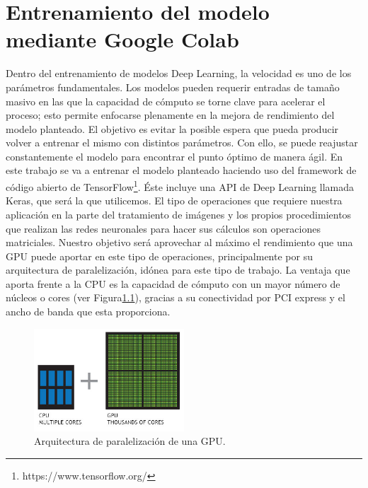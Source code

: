 \mbox{}


\chapter{Entrenamiento del modelo mediante Google Colab}
\label{ch:chapter2}
Dentro del entrenamiento de modelos Deep Learning, la velocidad es uno de los parámetros fundamentales.
Los modelos pueden requerir entradas de tamaño masivo en las que la capacidad de cómputo se torne clave para acelerar el proceso;
esto permite enfocarse plenamente en la mejora de rendimiento del modelo planteado.
El objetivo es evitar la posible espera que pueda producir volver a entrenar el mismo con distintos parámetros.
Con ello, se puede reajustar constantemente el modelo para encontrar el punto óptimo de manera ágil.
En este trabajo se va a entrenar el modelo planteado haciendo uso del framework de código abierto de TensorFlow\footnote{https://www.tensorflow.org/}.
Éste incluye una API de Deep Learning llamada Keras, que será la que utilicemos.
El tipo de operaciones que requiere nuestra aplicación en la parte del tratamiento de imágenes y los propios procedimientos que realizan las redes neuronales para hacer sus cálculos son operaciones matriciales.
Nuestro objetivo será aprovechar al máximo el rendimiento que una GPU puede aportar en este tipo de operaciones, principalmente por su arquitectura de paralelización, idónea para este tipo de trabajo.
La ventaja que aporta frente a la CPU es la capacidad de cómputo con un mayor número de núcleos o cores (ver Figura\ref{fig:Arquitectura de paralelización de una GPU}), gracias a su conectividad por PCI express y el ancho de banda que esta proporciona.

\begin{figure}
    \centering
    \includegraphics[width=0.5\textwidth]{images/chapter2/cpu-and-gpu.jpg}
    \caption{Arquitectura de paralelización de una GPU.}
    \label{fig:Arquitectura de paralelización de una GPU}
\end{figure}



